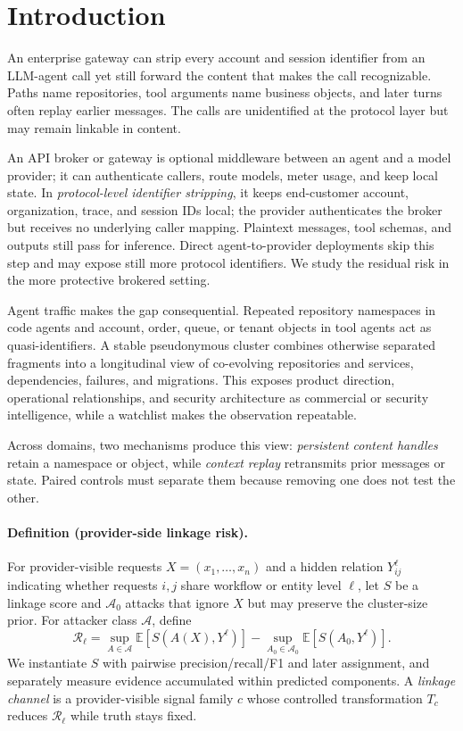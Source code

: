 \documentclass[letterpaper]{article} %
\begin{document}
\section{Introduction}

An enterprise gateway can strip every account and session identifier from an LLM-agent call yet
still forward the content that makes the call recognizable. Paths name repositories, tool arguments
name business objects, and later turns often replay earlier messages. The calls are unidentified at
the protocol layer but may remain linkable in content.

An API broker or gateway is optional middleware between an agent and a model provider; it can
authenticate callers, route models, meter usage, and keep local state. In \emph{protocol-level
identifier stripping}, it keeps end-customer account, organization, trace, and session IDs local;
the provider authenticates the broker but receives no underlying caller mapping. Plaintext messages,
tool schemas, and outputs still pass for inference. Direct agent-to-provider deployments skip this
step and may expose still more protocol identifiers. We study the residual risk in the more protective
brokered setting.

Agent traffic makes the gap consequential. Repeated repository namespaces in code agents and
account, order, queue, or tenant objects in tool agents act as quasi-identifiers. A stable
pseudonymous cluster combines otherwise separated fragments into a
longitudinal view of co-evolving repositories and services, dependencies, failures, and migrations.
This exposes product direction, operational relationships, and security architecture as commercial
or security intelligence, while a watchlist makes the observation repeatable.

Across domains, two mechanisms produce this view: \emph{persistent content handles} retain a
namespace or object, while \emph{context replay} retransmits prior messages or state. Paired controls
must separate them because removing one does not test the other.

\paragraph{Definition (provider-side linkage risk).}
For provider-visible requests $X=(x_1,\ldots,x_n)$ and a hidden relation $Y^\ell_{ij}$ indicating
whether requests $i,j$ share workflow or entity level $\ell$, let $S$ be a linkage score and
$\mathcal A_0$ attacks that ignore $X$ but may preserve the cluster-size prior. For attacker class
$\mathcal A$, define
\begin{equation}
\mathcal R_\ell=\sup_{A\in\mathcal A}\mathbb E[S(A(X),Y^\ell)]-
\sup_{A_0\in\mathcal A_0}\mathbb E[S(A_0,Y^\ell)].
\end{equation}
We instantiate $S$ with pairwise precision/recall/F1 and later assignment, and separately measure
evidence accumulated within predicted components. A \emph{linkage channel} is a provider-visible
signal family $c$ whose controlled transformation $T_c$ reduces $\mathcal R_\ell$ while truth stays fixed.
\end{document}
